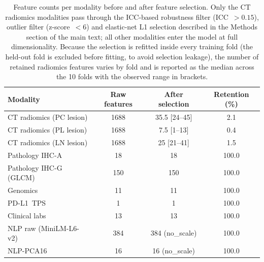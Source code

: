 \documentclass[12pt]{article}
\begin{document}
\begin{table}[H]
\centering
\caption{Feature counts per modality before and after feature selection.
  Only the CT radiomics modalities pass through the ICC-based robustness
  filter (ICC~$>0.15$), outlier filter (z-score~$<6$) and elastic-net L1
  selection described in the Methods section of the main text; all other
  modalities enter the model at full dimensionality.
  Because the selection is refitted inside every training fold (the held-out
  fold is excluded before fitting, to avoid selection leakage), the number
  of retained radiomics features varies by fold and is reported as the
  median across the 10 folds with the observed range in brackets.}
\label{tab:supp_features}
\begin{tabular}{lccc}
\toprule
\textbf{Modality} & \textbf{Raw features} & \textbf{After selection} &
\textbf{Retention (\%)} \\
\midrule
CT radiomics (PC lesion)       & 1688 & 35.5 [24--45] & 2.1 \\
CT radiomics (PL lesion)       & 1688 & 7.5 [1--13]  & 0.4 \\
CT radiomics (LN lesion)       & 1688 & 25 [21--41] & 1.5 \\
Pathology IHC-A                & 18   & 18           & 100.0 \\
Pathology IHC-G (GLCM)         & 150  & 150          & 100.0 \\
Genomics                       & 11   & 11           & 100.0 \\
PD-L1~TPS                      & 1    & 1            & 100.0 \\
Clinical labs                  & 13   & 13           & 100.0 \\
NLP raw (MiniLM-L6-v2)         & 384  & 384 (no\_scale) & 100.0 \\
NLP-PCA16                      & 16   & 16 (no\_scale)  & 100.0 \\
\bottomrule
\end{tabular}
\end{table}





\end{document}
